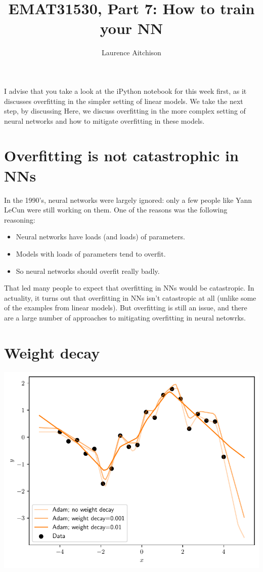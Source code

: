 \documentclass{article}
\title{EMAT31530, Part 7: How to train your NN}
\author{Laurence Aitchison}
\date{}
\newcommand{\0}{\mathbf{0}}
\begin{document}
\maketitle

I advise that you take a look at the iPython notebook for this week first, as it discusses overfitting in the simpler setting of linear models.  We take the next step, by discussing Here, we discuss overfitting in the more complex setting of neural networks and how to mitigate overfitting in these models.

\section{Overfitting is not catastrophic in NNs}

In the 1990's, neural networks were largely ignored: only a few people like Yann LeCun were still working on them.
One of the reasons was the following reasoning:
\begin{itemize}
  \item Neural networks have loads (and loads) of parameters.
  \item Models with loads of parameters tend to overfit.
  \item So neural networks should overfit really badly.
\end{itemize}
That led many people to expect that overfitting in NNs would be catastropic.
In actuality, it turns out that overfitting in NNs isn't catastropic at all (unlike some of the examples from linear models).
But overfitting is still an issue, and there are a large number of approaches to mitigating overfitting in neural netowrks.


\newpage
\section{Weight decay}
\includegraphics[width=\textwidth]{weight_decay.pdf}
\end{document}
